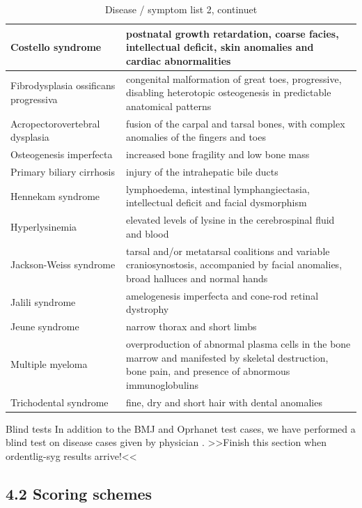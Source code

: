 \begin{table}[h]
\caption{Disease / symptom list 2, continuet}
\begin{tabular}{| p{5.5cm} | p{5.5cm}|}
\hline
Costello syndrome & postnatal growth retardation, coarse facies, intellectual deficit, skin anomalies and cardiac abnormalities \\
\hline
Fibrodysplasia ossificans progressiva & congenital malformation of great toes, progressive, disabling heterotopic osteogenesis in predictable anatomical patterns \\
\hline
Acropectorovertebral dysplasia & fusion of the carpal and tarsal bones, with complex anomalies of the fingers and toes \\
\hline
Osteogenesis imperfecta & increased bone fragility and low bone mass \\
\hline
Primary biliary cirrhosis & injury of the intrahepatic bile ducts \\
\hline
Hennekam syndrome & lymphoedema, intestinal lymphangiectasia, intellectual deficit and facial dysmorphism \\
\hline
Hyperlysinemia & elevated levels of lysine in the cerebrospinal fluid and blood \\
\hline
Jackson-Weiss syndrome & tarsal and/or metatarsal coalitions and variable craniosynostosis, accompanied by facial anomalies, broad halluces and normal hands \\
\hline
Jalili syndrome & amelogenesis imperfecta and cone-rod retinal dystrophy \\
\hline
Jeune syndrome & narrow thorax and short limbs \\
\hline
Multiple myeloma & overproduction of abnormal plasma cells in the bone marrow and manifested by skeletal destruction, bone pain, and presence of abnormous immunoglobulins \\
\hline
Trichodental syndrome & fine, dry and short hair with dental anomalies \\
\hline
\end{tabular}
\end{table}

Blind tests
In addition to the BMJ and Oprhanet test cases, we have performed a blind test on disease cases given by physician \cite{TheDude}.
>>Finish this section when ordentlig-syg results arrive!<<

\subsection{4.2 Scoring schemes}

